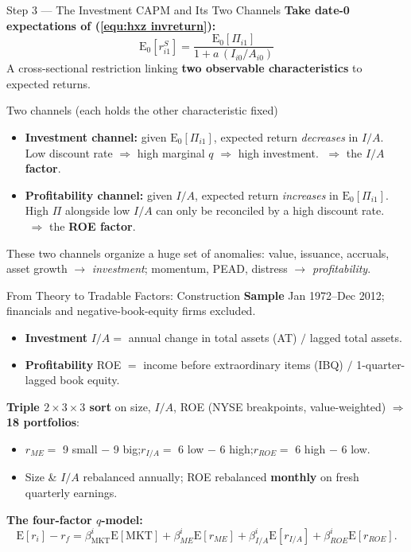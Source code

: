 \documentclass{beamer}
\begin{document}
\begin{frame}{Step 3 --- The Investment CAPM and Its Two Channels}
	\textbf{Take date-0 expectations of (\ref{equ:hxz invreturn}):}
	\begin{equation}\label{equ:hxz icapm}
		\boxed{\;\mathrm{E}_0\!\left[r^S_{i1}\right]=\frac{\mathrm{E}_0[\Pi_{i1}]}{1+a\,(I_{i0}/A_{i0})}\;}
	\end{equation}
	A cross-sectional restriction linking \textbf{two observable characteristics} to expected returns.
	\begin{block}{Two channels (each holds the other characteristic fixed)}
		\begin{itemize}
			\item \textbf{Investment channel:} given $\mathrm{E}_0[\Pi_{i1}]$, expected return \textit{decreases} in $I/A$.\\
			{\footnotesize Low discount rate $\Rightarrow$ high marginal $q$ $\Rightarrow$ high investment. $\;\Rightarrow$ the \textbf{$I/A$ factor}.}
			\item \textbf{Profitability channel:} given $I/A$, expected return \textit{increases} in $\mathrm{E}_0[\Pi_{i1}]$.\\
			{\footnotesize High $\Pi$ alongside low $I/A$ can only be reconciled by a high discount rate. $\;\Rightarrow$ the \textbf{ROE factor}.}
		\end{itemize}
	\end{block}
	These two channels organize a huge set of anomalies: value, issuance, accruals, asset growth $\to$ \textit{investment}; momentum, PEAD, distress $\to$ \textit{profitability}.
\end{frame}

\begin{frame}{From Theory to Tradable Factors: Construction}
	\textbf{Sample} Jan 1972--Dec 2012; financials and negative-book-equity firms excluded.
	\begin{itemize}
		\item \textbf{Investment} $I/A=$ annual change in total assets (AT) $/$ lagged total assets.
		\item \textbf{Profitability} ROE $=$ income before extraordinary items (IBQ) $/$ 1-quarter-lagged book equity.
	\end{itemize}
	\textbf{Triple $2\times3\times3$ sort} on size, $I/A$, ROE (NYSE breakpoints, value-weighted) $\Rightarrow$ \textbf{18 portfolios}:
	\begin{itemize}
		\item $r_{ME}=$ 9 small $-$ 9 big;\quad $r_{I/A}=$ 6 low $-$ 6 high;\quad $r_{ROE}=$ 6 high $-$ 6 low.
		\item Size \& $I/A$ rebalanced annually; ROE rebalanced \textbf{monthly} on fresh quarterly earnings.
	\end{itemize}
	\textbf{The four-factor $q$-model:}
	\begin{equation}\label{equ:qmodel}
		\mathrm{E}[r_i]-r_f=\beta^i_{\text{MKT}}\mathrm{E}[\text{MKT}]+\beta^i_{ME}\mathrm{E}[r_{ME}]+\beta^i_{I/A}\mathrm{E}[r_{I/A}]+\beta^i_{ROE}\mathrm{E}[r_{ROE}].
	\end{equation}
\end{frame}
\end{document}
